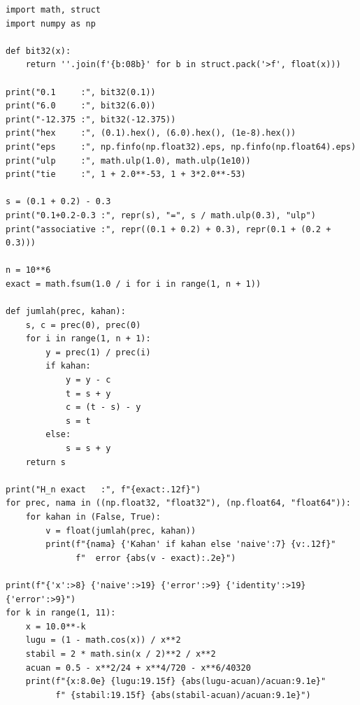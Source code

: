 \begin{lab}
\begin{verbatim}
import math, struct
import numpy as np

def bit32(x):
    return ''.join(f'{b:08b}' for b in struct.pack('>f', float(x)))

print("0.1     :", bit32(0.1))
print("6.0     :", bit32(6.0))
print("-12.375 :", bit32(-12.375))
print("hex     :", (0.1).hex(), (6.0).hex(), (1e-8).hex())
print("eps     :", np.finfo(np.float32).eps, np.finfo(np.float64).eps)
print("ulp     :", math.ulp(1.0), math.ulp(1e10))
print("tie     :", 1 + 2.0**-53, 1 + 3*2.0**-53)

s = (0.1 + 0.2) - 0.3
print("0.1+0.2-0.3 :", repr(s), "=", s / math.ulp(0.3), "ulp")
print("associative :", repr((0.1 + 0.2) + 0.3), repr(0.1 + (0.2 + 0.3)))

n = 10**6
exact = math.fsum(1.0 / i for i in range(1, n + 1))

def jumlah(prec, kahan):
    s, c = prec(0), prec(0)
    for i in range(1, n + 1):
        y = prec(1) / prec(i)
        if kahan:
            y = y - c
            t = s + y
            c = (t - s) - y
            s = t
        else:
            s = s + y
    return s

print("H_n exact   :", f"{exact:.12f}")
for prec, nama in ((np.float32, "float32"), (np.float64, "float64")):
    for kahan in (False, True):
        v = float(jumlah(prec, kahan))
        print(f"{nama} {'Kahan' if kahan else 'naive':7} {v:.12f}"
              f"  error {abs(v - exact):.2e}")

print(f"{'x':>8} {'naive':>19} {'error':>9} {'identity':>19} {'error':>9}")
for k in range(1, 11):
    x = 10.0**-k
    lugu = (1 - math.cos(x)) / x**2
    stabil = 2 * math.sin(x / 2)**2 / x**2
    acuan = 0.5 - x**2/24 + x**4/720 - x**6/40320
    print(f"{x:8.0e} {lugu:19.15f} {abs(lugu-acuan)/acuan:9.1e}"
          f" {stabil:19.15f} {abs(stabil-acuan)/acuan:9.1e}")


\end{verbatim}
\end{lab}
